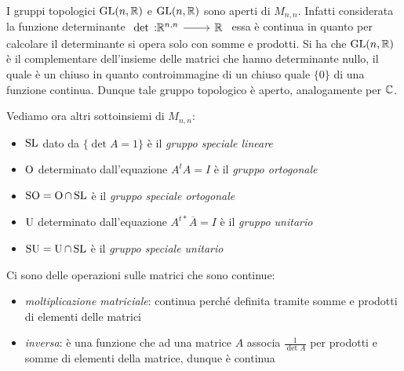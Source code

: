 \begin{observe}
	I gruppi topologici $\operatorname{GL} (n,\mathbb{R} )$ e $\operatorname{GL} (n, \mathbb{R} )$ sono aperti di $M_{n,n}$.\newline
	Infatti considerata la funzione determinante $\funz \det {\realset^{n,n}} \realset$ essa è continua in quanto per calcolare il determinante si opera solo con somme e prodotti. Si ha che $\operatorname{GL}(n, \mathbb{R})$ è il complementare dell'insieme delle matrici che hanno determinante nullo, il quale è un chiuso in quanto controimmagine di un chiuso quale $\{0\}$ di una funzione continua. Dunque tale gruppo topologico è aperto, analogamente per $\mathbb{C}$.
\end{observe}
Vediamo ora altri sottoinsiemi di $M_{n,n}$:
	\begin{itemize}
		\item $\operatorname{SL}$ dato da $\{\det A=1\} $ è il \textit{gruppo speciale lineare}
		\item $\operatorname{O}$ determinato dall'equazione $A^{t}A=I$ è il \textit{gruppo ortogonale}
		\item $\operatorname{SO}=\operatorname{O}\cap\operatorname{SL}$ è il \textit{gruppo speciale ortogonale}
		\item $\operatorname{U}$ determinato dall'equazione $A^{t*}\overline{A}=I$ è il \textit{gruppo unitario}
		\item $\operatorname{SU}=\operatorname{U}\cap\operatorname{SL}$ è il \textit{gruppo speciale unitario}
	\end{itemize}

Ci sono delle operazioni sulle matrici che sono continue:
	\begin{itemize}
		\item \textit{moltiplicazione matriciale}: continua perché definita tramite somme e prodotti di elementi delle matrici
		\item \textit{inversa}: è una funzione che ad una matrice $A$ associa $\displaystyle \frac{1}{\det A}$ per prodotti e somme di elementi della matrice, dunque è continua
	\end{itemize}

